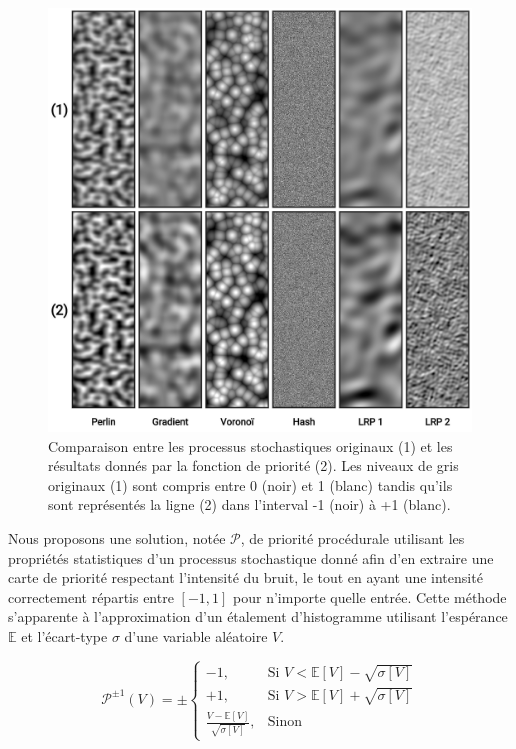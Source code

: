 \documentclass[9pt, twocolumn]{article} %
\begin{document}
\begin{figure}
  \includegraphics[width=\linewidth]{figures/MixMax_Priority.png}
  \caption{Comparaison entre les processus stochastiques originaux (1) et les résultats donnés par la fonction de priorité (2). Les niveaux de gris originaux (1) sont compris entre 0 (noir) et 1 (blanc) tandis qu'ils sont représentés la ligne (2) dans l'interval -1 (noir) à +1 (blanc).
  }
  \label{fig::MixMax_Priority}
\end{figure}

Nous proposons une solution, notée $\mathcal{P}$, de priorité procédurale
utilisant les propriétés statistiques d'un processus stochastique donné afin
d'en extraire une carte de priorité respectant l'intensité du bruit, le tout en
ayant une intensité correctement répartis entre $[-1, 1]$ pour n'importe quelle
entrée. Cette méthode s'apparente à l'approximation d'un étalement
d'histogramme utilisant l'espérance $\mathbb{E}$ et l'écart-type $\sigma$ d'une
variable aléatoire $V$.

\begin{equation}\label{ProceduralPriorityFormula}
  \mathcal P^{\pm 1}(V) =
  \pm
  \begin{cases}
    -1,                                         & \text{Si } V < \mathbb{E}[V]- \sqrt{\sigma[V]} \\
    +1,                                         & \text{Si } V > \mathbb{E}[V]+ \sqrt{\sigma[V]} \\
    \frac{V - \mathbb{E}[V]}{\sqrt{\sigma[V]}}, & \text{Sinon}
  \end{cases}
\end{equation}
\end{document}

